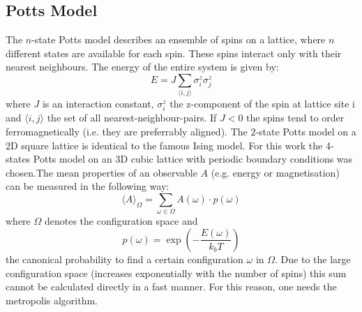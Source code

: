 \documentclass[letterpaper]{article}
\begin{document}
\subsection{Potts Model}
The $n$-state Potts model describes an ensemble of spins on a lattice, where $n$ different
states are available for each spin. These spins interact only with
their nearest neighbours. The energy of the entire system is given
by:
\[
E=J\sum_{\langle i,j \rangle}\sigma_{i}^{z}\sigma_{j}^{z}
\]
where $J$ is an interaction constant, $\sigma_{i}^{z}$ the z-component of the
spin at lattice site i and $\langle i,j \rangle$ the set of all nearest-neighbour-pairs.
If $J<0$ the spins tend to order ferromagnetically (i.e. they are preferrably aligned). The $2$-state Potts model on a 2D square lattice is identical to the famous Ising
model. For this work the 4-states Potts model on an 3D cubic lattice
with periodic boundary conditions was chosen.\newline The mean properties of an observable $A$
(e.g. energy or magnetisation) can be measured in the following way:
\[
\langle A\rangle_\Omega=\sum_{\omega\in\Omega}A(\omega)\cdot p(\omega)
\]
where $\Omega$ denotes the configuration space and \[p(\omega)=\exp{\left(-\frac{E(\omega)}{k_{b}T}\right)}\]
the canonical probability to find a certain configuration $\omega$
in $\Omega$. 
Due to the large configuration space (increases exponentially with
the number of spins) this sum cannot be calculated directly in a fast
manner. For this reason, one needs the metropolis algorithm.
\end{document}
